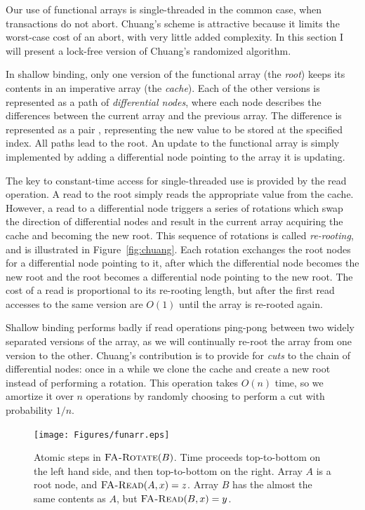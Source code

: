 Our use of functional arrays is single-threaded in the common case,
when transactions do not abort.  Chuang's scheme is attractive because
it limits the worst-case cost of an abort, with very little added
complexity.   In this section I will present a lock-free version of
Chuang's randomized algorithm.

In shallow binding, only one version of the functional array (the
\emph{root}) keeps its contents in an imperative array (the
\emph{cache}).   Each of the other versions is represented as a path
of \emph{differential nodes}, where each node describes the
differences between the current array and the previous array.  The
difference is represented as a pair ,
representing the new value to be stored at the specified index.
All paths lead to the root.  An update to the functional array is
simply implemented by adding a differential node pointing to the array it is
updating.

The key to constant-time access for single-threaded use is provided by the read
operation.  A read to the root simply reads the appropriate value from
the cache.  However, a read to a differential node triggers a series
of rotations which swap the direction of differential nodes and result
in the current array acquiring the cache and becoming the new root.
This sequence of rotations is called \emph{re-rooting}, and is
illustrated in Figure~\ref{fig:chuang}.  Each rotation
exchanges the root nodes for a differential node pointing to it, after
which the differential node becomes the new root and the root becomes
a differential node pointing to the new root. The cost of a read is
proportional to its re-rooting length, but after the first read
accesses to the same version are $O(1)$ until the array is re-rooted again.

Shallow binding performs badly if read operations ping-pong between two
widely separated versions of the array, as we will continually
re-root the array from one version to the other.
Chuang's contribution is to provide for \emph{cuts} to the chain of
differential nodes: once in a while we clone the cache and create a
new root instead of performing a rotation.  This operation takes
$O(n)$ time, so we amortize it over $n$ operations by randomly
choosing to perform a cut with probability $1/n$.

\begin{figure}\centering%
\texttt{[image: Figures/funarr.eps]}
\caption[Atomic steps in $\funcname{FA-Rotate}(B)$.]%
 {Atomic steps in $\funcname{FA-Rotate}(B)$.  Time proceeds top-to-bottom
  on the left hand side, and then top-to-bottom on the right.
  Array $A$ is a root node, and $\text{\sc FA-Read}(A, x)=z$.
  Array $B$ has the almost the same contents as $A$, but
  $\text{\sc FA-Read}(B, x)=y$.}
\label{fig:funarr}
\end{figure}

